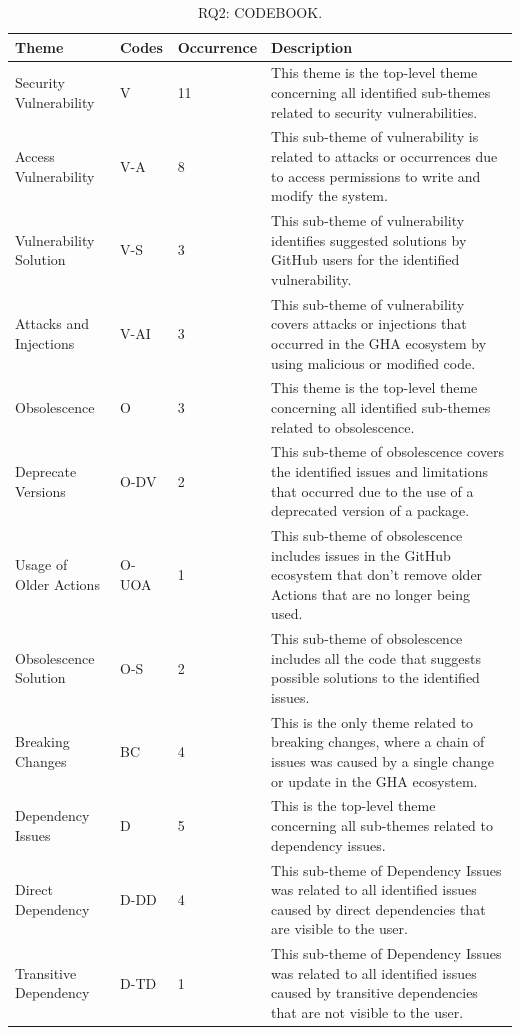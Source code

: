 \documentclass[conference]{IEEEtran}
\begin{document}
\begin{table}[!t]
    \centering
    \caption{RQ2: CODEBOOK.}
    \label{tab:full-width}
    \hspace{0.5cm}
    \begin{tabular}{|p{3cm}|p{1cm}|p{1.5cm}|p{11cm}|}
        \hline
        \textbf{Theme} & \textbf{Codes}  & \textbf{Occurrence}  & \textbf{Description} \\
        \hline
        Security Vulnerability & V & 11 & This theme is the top-level theme concerning all identified sub-themes related to security vulnerabilities. \\
        \hline
        Access Vulnerability & V-A & 8 & This sub-theme of vulnerability is related to attacks or occurrences due to access permissions to write and modify the system. \\
        \hline
        Vulnerability Solution & V-S & 3 & This sub-theme of vulnerability identifies suggested solutions by GitHub users for the identified vulnerability.\\
        \hline
        Attacks and Injections & V-AI & 3 & This sub-theme of vulnerability covers attacks or injections that occurred in the GHA ecosystem by using malicious or modified code. \\
        \hline
        Obsolescence & O & 3 & This theme is the top-level theme concerning all identified sub-themes related to obsolescence.\\
        \hline
        Deprecate Versions & O-DV & 2 & This sub-theme of obsolescence covers the identified issues and limitations that occurred due to the use of a deprecated version of a package. \\
        \hline
        Usage of Older Actions & O-UOA & 1& This sub-theme of obsolescence includes issues in the GitHub ecosystem that don't remove older Actions that are no longer being used. \\
        \hline
        Obsolescence Solution & O-S & 2 & This sub-theme of obsolescence includes all the code that suggests possible solutions to the identified issues. \\
        \hline
        Breaking Changes & BC & 4 & This is the only theme related to breaking changes, where a chain of issues was caused by a single change or update in the GHA ecosystem. \\
        \hline
        Dependency Issues & D & 5 & This is the top-level theme concerning all sub-themes related to dependency issues. \\	
        \hline
        Direct Dependency  & D-DD & 4 & This sub-theme of Dependency Issues was related to all identified issues caused by direct dependencies that are visible to the user. \\	
        \hline
        Transitive Dependency & D-TD & 1 & This sub-theme of Dependency Issues was related to all identified issues caused by transitive dependencies that are not visible to the user.\\	
        \hline
    \end{tabular}
\end{table}
\end{document}
